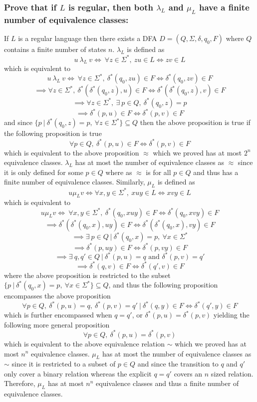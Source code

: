 \documentclass[12pt]{article}
\begin{document}
\subsubsection*{Prove that if $L$ is regular, then both $\lambda_L$ and $\mu_L$
have a finite number of equivalence classes:}
If $L$ is a regular language then there exists a DFA $D = (Q, \Sigma, \delta,
q_0, F)$ where $Q$ contains a finite number of states $n$.
\vspace{5 mm}
\newline
$\lambda_L$ is defined as
$$u\ \lambda_L\ v \iff\ \forall z \in \Sigma^*,\ zu \in L \iff zv \in L$$
which is equivalent to
$$u\ \lambda_L\ v \iff\ \forall z \in \Sigma^*,\ \delta^*(q_0, zu) \in F
\iff \delta^*(q_0, zv) \in F$$
$$\implies \forall z \in \Sigma^*,\ \delta^*(\delta^*(q_0, z),u) \in F
\iff \delta^*(\delta^*(q_0, z),v) \in F$$
$$\implies \forall z \in \Sigma^*,\ \exists\ p \in Q,\ \delta^*(q_0, z) = p$$
$$\implies \delta^*(p,u) \in F \iff \delta^*(p,v) \in F$$
and since $\{p\ |\ \delta^*(q_0, z) = p,\ \forall z \in \Sigma^*\} \subseteq Q$
then the above proposition is true if the following proposition is true
$$\forall p \in Q,\ \delta^*(p,u) \in F \iff \delta^*(p,v) \in F$$
which is equivalent to the above proposition $\approx$ which we proved has at
most $2^n$ equivalence classes. $\lambda_L$ has at most the number of
equivalence classes as $\approx$ since it is only defined for some
$p \in Q$ where as $\approx$ is for all $p \in Q$ and thus has a finite
number of equivalence classes.
\vspace{5 mm}
\newline
Similarly, $\mu_L$ is defined as
$$u \mu_L v \iff \forall x,y \in \Sigma^*,\ xuy \in L \iff xvy \in L$$
which is equivalent to
$$u \mu_L v \iff\ \forall x,y \in \Sigma^*,\ \delta^*(q_0, xuy) \in F \iff
\delta^*(q_0,xvy) \in F$$
$$\implies \delta^*(\delta^*(q_0,x),uy) \in F \iff
\delta^*(\delta^*(q_0, x),vy) \in F$$
$$\implies \exists\ p \in Q\ |\ \delta^*(q_0,x) = p,\ \forall x \in \Sigma^*$$
$$\implies \delta^*(p,uy) \in F \iff \delta^*(p, vy) \in F$$
$$\implies \exists\ q,q' \in Q\ |\ \delta^*(p,u) = q \text{ and }
\delta^*(p,v) = q'$$
$$\implies \delta^*(q,v) \in F \iff \delta^*(q',v) \in F$$
where the above proposition is restricted to the subset
$\{p\ |\ \delta^*(q_0, x) = p,\ \forall x \in \Sigma^*\} \subseteq Q$,
and thus the following proposition encompasses the above proposition
$$\forall p \in Q,\ \delta^*(p, u) = q,\ \delta^*(p,v) = q'
\ |\ \delta^*(q, y) \in F \iff \delta^*(q', y) \in F$$
which is further encompassed when $q = q'$, or $\delta^*(p,u) = \delta^*(p,v)$
yielding the following more general proposition
$$\forall p \in Q,\ \delta^*(p,u) = \delta^*(p,v)$$
which is equivalent to the above equivalence relation $\sim$ which we proved has
at most $n^n$ equivalence classes. $\mu_L$ has at most the number of equivalence
classes as $\sim$ since it is restricted to a subset of $p \in Q$ and
since the transition to $q$ and $q'$ only cover a binary relation whereas
the explicit $q = q'$ covers an $n$ sized relation. Therefore, $\mu_L$ has at
most $n^n$ equivalence classes and thus a finite number of equivalence classes.
\end{document}
